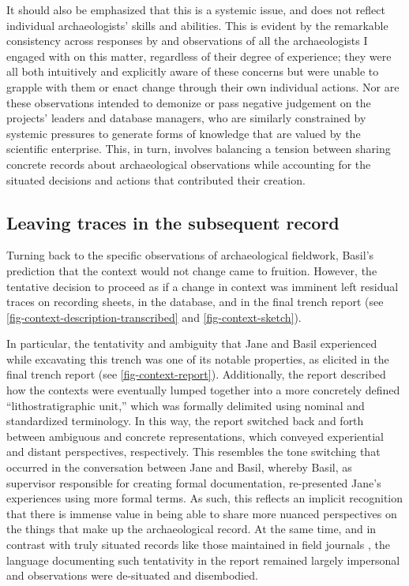 \documentclass{article}
\begin{document}
It should also be emphasized that this is a systemic issue, and does not
reflect individual archaeologists' skills and abilities. This is evident
by the remarkable consistency across responses by and observations of
all the archaeologists I engaged with on this matter, regardless of
their degree of experience; they were all both intuitively and
explicitly aware of these concerns but were unable to grapple with them
or enact change through their own individual actions. Nor are these
observations intended to demonize or pass negative judgement on the
projects' leaders and database managers, who are similarly constrained
by systemic pressures to generate forms of knowledge that are valued by
the scientific enterprise. This, in turn, involves balancing a tension
between sharing concrete records about archaeological observations while
accounting for the situated decisions and actions that contributed their
creation.

\subsection{Leaving traces in the subsequent
record}\label{leaving-traces-in-the-subsequent-record}

Turning back to the specific observations of archaeological fieldwork,
Basil's prediction that the context would not change came to fruition.
However, the tentative decision to proceed as if a change in context was
imminent left residual traces on recording sheets, in the database, and
in the final trench report (see
\autoref{fig-context-description-transcribed} and
\autoref{fig-context-sketch}).

In particular, the tentativity and ambiguity that Jane and Basil
experienced while excavating this trench was one of its notable
properties, as elicited in the final trench report (see
\autoref{fig-context-report}). Additionally, the report described how
the contexts were eventually lumped together into a more concretely
defined ``lithostratigraphic unit,'' which was formally delimited using
nominal and standardized terminology. In this way, the report switched
back and forth between ambiguous and concrete representations, which
conveyed experiential and distant perspectives, respectively. This
resembles the tone switching that occurred in the conversation between
Jane and Basil, whereby Basil, as supervisor responsible for creating
formal documentation, re-presented Jane's experiences using more formal
terms. As such, this reflects an implicit recognition that there is
immense value in being able to share more nuanced perspectives on the
things that make up the archaeological record. At the same time, and in
contrast with truly situated records like those maintained in field
journals \parencite[cf.][]{batist2024a}, the language documenting
such tentativity in the report remained largely impersonal and
observations were de-situated and disembodied.
\end{document}
